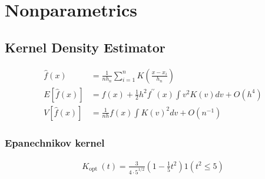 \section{Nonparametrics}

\subsection{Kernel Density Estimator}

\begin{align*}
    \widehat{f}(x) &= \frac{1}{n h_n} \sum_{i=1}^n K\left(\frac{x-x_i}{h_n}\right) \\
    E[\widehat{f}(x)] &= f(x)+\frac{1}{2} h^2 f^{\prime \prime}(x) \int v^2 K(v) d v+O\left(h^4\right) \\
    V[\widehat{f}(x)] &= \frac{1}{n h} f(x) \int K(v)^2 d v+O\left(n^{-1}\right)
\end{align*}

\subsubsection{Epanechnikov kernel}

\begin{align*}
    K_{\text {opt }}(t)=\frac{3}{4 \cdot 5^{1 / 2}}\left(1-\frac{1}{5} t^2\right) 1\left(t^2 \leq 5\right)
\end{align*}